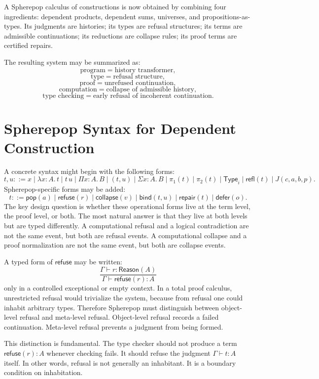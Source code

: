 \documentclass[12pt,oneside]{article}
\newcommand{\Pop}{\mathsf{pop}}
\newcommand{\Refuse}{\mathsf{refuse}}
\newcommand{\Collapse}{\mathsf{collapse}}
\newcommand{\Bind}{\mathsf{bind}}
\newcommand{\Type}{\mathsf{Type}}
\newcommand{\judges}{\vdash}
\begin{document}
A Spherepop calculus of constructions is now obtained by combining four ingredients: dependent products, dependent sums, universes, and propositions-as-types. Its judgments are histories; its types are refusal structures; its terms are admissible continuations; its reductions are collapse rules; its proof terms are certified repairs.

The resulting system may be summarized as:
\[
\text{program} = \text{history transformer},
\]
\[
\text{type} = \text{refusal structure},
\]
\[
\text{proof} = \text{unrefused continuation},
\]
\[
\text{computation} = \text{collapse of admissible history},
\]
\[
\text{type checking} = \text{early refusal of incoherent continuation}.
\]

\section{Spherepop Syntax for Dependent Construction}

A concrete syntax might begin with the following forms:
\[
t,u ::= x
\mid \lambda x:A.\,t
\mid t\,u
\mid \Pi x:A.\,B
\mid (t,u)
\mid \Sigma x:A.\,B
\mid \pi_1(t)
\mid \pi_2(t)
\mid \Type_i
\mid \mathsf{refl}(t)
\mid J(c,a,b,p).
\]
Spherepop-specific forms may be added:
\[
t ::= \Pop(a)
\mid \Refuse(r)
\mid \Collapse(v)
\mid \Bind(t,u)
\mid \mathsf{repair}(t)
\mid \mathsf{defer}(o).
\]
The key design question is whether these operational forms live at the term level, the proof level, or both. The most natural answer is that they live at both levels but are typed differently. A computational refusal and a logical contradiction are not the same event, but both are refusal events. A computational collapse and a proof normalization are not the same event, but both are collapse events.

A typed form of $\Refuse$ may be written:
\[
\frac{\Gamma \judges r:\mathsf{Reason}(A)}
{\Gamma \judges \Refuse(r):A}
\]
only in a controlled exceptional or empty context. In a total proof calculus, unrestricted refusal would trivialize the system, because from refusal one could inhabit arbitrary types. Therefore Spherepop must distinguish between object-level refusal and meta-level refusal. Object-level refusal records a failed continuation. Meta-level refusal prevents a judgment from being formed.

This distinction is fundamental. The type checker should not produce a term $\Refuse(r):A$ whenever checking fails. It should refuse the judgment $\Gamma \judges t:A$ itself. In other words, refusal is not generally an inhabitant. It is a boundary condition on inhabitation.
\end{document}
